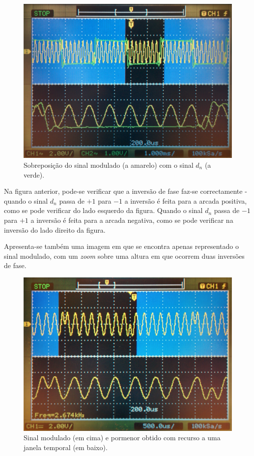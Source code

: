 \documentclass[11pt]{article}
\numberwithin{equation}{section}
\begin{document}
\begin{figure}[H]
	\centering
	\includegraphics[keepaspectratio=true, scale=0.09]{exps/dn_com_y}
	\caption{Sobreposição do sinal modulado (a amarelo) com o sinal $d_n$ (a verde).}
	\vspace{-0.8em}
\end{figure}

Na figura anterior, pode-se verificar que a inversão de fase faz-se correctamente - quando o sinal $d_n$ passa de $+1$ para $-1$ a inversão é feita para a arcada positiva, como se pode verificar do lado esquerdo da figura. Quando o sinal $d_n$ passa de $-1$ para $+1$ a inversão é feita para a arcada negativa, como se pode verificar na inversão do lado direito da figura.

Apresenta-se também uma imagem em que se encontra apenas representado o sinal modulado, com um \textit{zoom} sobre uma altura em que ocorrem duas inversões de fase. 

\begin{figure}[H]
	\centering
	\includegraphics[keepaspectratio=true, scale=0.10]{exps/BPSK_modulated}
	\caption{Sinal modulado (em cima) e pormenor obtido com recurso a uma janela temporal (em baixo).}
	\vspace{-0.8em}
\end{figure}
\end{document}
